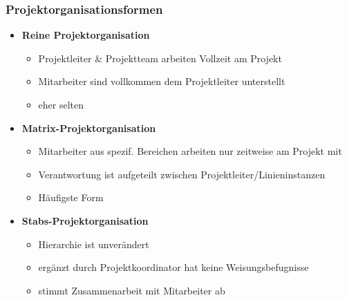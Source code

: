 \subsubsection{Projektorganisationsformen}
\begin{multicols}{3}
	\begin{itemize}
		\item \textbf{Reine Projektorganisation}
		\begin{itemize}
			\item Projektleiter \& Projektteam arbeiten Vollzeit am Projekt
			\item Mitarbeiter sind voll\-kommen dem Projektleiter \newline unterstellt
			\item eher selten
		\end{itemize}
		\item \textbf{Matrix-Projektorganisation}
		\begin{itemize}
			\item Mitarbeiter aus spezif. \newline Bereichen arbeiten nur zeitweise am Projekt mit
			\item Verantwortung ist aufgeteilt zwischen Projektleiter/Linieninstanzen
			\item Häufigste Form
		\end{itemize}
		\item \textbf{Stabs-Projektorganisation}
		\begin{itemize}
			\item Hierarchie ist unverändert
			\item ergänzt durch Projektkoordinator hat keine \newline Weisungsbefugnisse
			\item stimmt Zusammenarbeit mit Mitarbeiter ab
		\end{itemize}
	\end{itemize}
\end{multicols}

